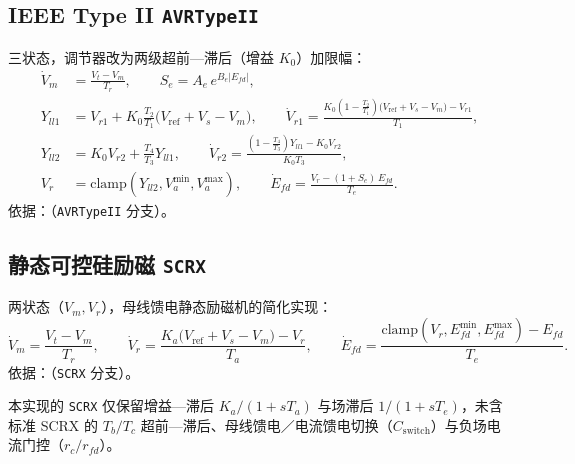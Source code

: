 \subsection{IEEE Type II \texttt{AVRTypeII}}
三状态，调节器改为两级超前—滞后（增益 $K_0$）加限幅：
\begin{align}
 \dot V_m&=\frac{V_t-V_m}{T_r},\qquad S_e=A_e\,e^{B_e|E_{fd}|},\\
 Y_{ll1}&=V_{r1}+K_0\frac{T_2}{T_1}\big(V_{\mathrm{ref}}+V_s-V_m\big),\qquad
 \dot V_{r1}=\frac{K_0\!\left(1-\tfrac{T_2}{T_1}\right)\!\big(V_{\mathrm{ref}}+V_s-V_m\big)-V_{r1}}{T_1},\\
 Y_{ll2}&=K_0 V_{r2}+\frac{T_4}{T_3}Y_{ll1},\qquad
 \dot V_{r2}=\frac{\left(1-\tfrac{T_4}{T_3}\right)Y_{ll1}-K_0 V_{r2}}{K_0 T_3},\\
 V_r&=\mathrm{clamp}(Y_{ll2},V_a^{\min},V_a^{\max}),\qquad
 \dot E_{fd}=\frac{V_r-(1+S_e)\,E_{fd}}{T_e}.
\end{align}
依据：（\texttt{AVRTypeII} 分支）。

\subsection{静态可控硅励磁 \texttt{SCRX}}
两状态（$V_m,V_r$），母线馈电静态励磁机的简化实现：
\begin{equation}
 \dot V_m=\frac{V_t-V_m}{T_r},\qquad
 \dot V_r=\frac{K_a\big(V_{\mathrm{ref}}+V_s-V_m\big)-V_r}{T_a},\qquad
 \dot E_{fd}=\frac{\mathrm{clamp}(V_r,E_{fd}^{\min},E_{fd}^{\max})-E_{fd}}{T_e}.
\end{equation}
依据：（\texttt{SCRX} 分支）。

\begin{gapnote}
本实现的 \texttt{SCRX} 仅保留增益—滞后 $K_a/(1+sT_a)$ 与场滞后 $1/(1+sT_e)$，未含标准 SCRX 的
$T_b/T_c$ 超前—滞后、母线馈电／电流馈电切换（$C_{\mathrm{switch}}$）与负场电流门控（$r_{c}/r_{fd}$）。
\end{gapnote}

